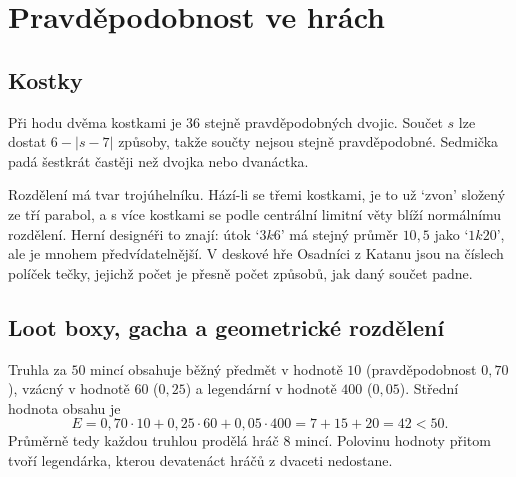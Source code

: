 \section{Pravděpodobnost ve hrách}

\subsection{Kostky}

Při hodu dvěma kostkami je $36$ stejně pravděpodobných dvojic. Součet $s$ lze dostat $6 - |s - 7|$ způsoby, takže součty nejsou stejně pravděpodobné. Sedmička padá šestkrát častěji než dvojka nebo dvanáctka.

\begin{center}
\end{center}

Rozdělení má tvar trojúhelníku. Hází-li se třemi kostkami, je to už `zvon' složený ze tří parabol, a s více kostkami se podle centrální limitní věty blíží normálnímu rozdělení. Herní designéři to znají: útok `$3k6$' má stejný průměr $10{,}5$ jako `$1k20$', ale je mnohem předvídatelnější. V deskové hře Osadníci z Katanu jsou na číslech políček tečky, jejichž počet je přesně počet způsobů, jak daný součet padne.

\subsection{Loot boxy, gacha a geometrické rozdělení}

\begin{example}
  Truhla za $50$ mincí obsahuje běžný předmět v hodnotě $10$ (pravděpodobnost $0{,}70$), vzácný v hodnotě $60$ ($0{,}25$) a legendární v hodnotě $400$ ($0{,}05$). Střední hodnota obsahu je
  \begin{equation*}
    E = 0{,}70\cdot 10 + 0{,}25\cdot 60 + 0{,}05\cdot 400 = 7 + 15 + 20 = 42 < 50.
  \end{equation*}
  Průměrně tedy každou truhlou prodělá hráč $8$ mincí. Polovinu hodnoty přitom tvoří legendárka, kterou devatenáct hráčů z dvaceti nedostane.
\end{example}

